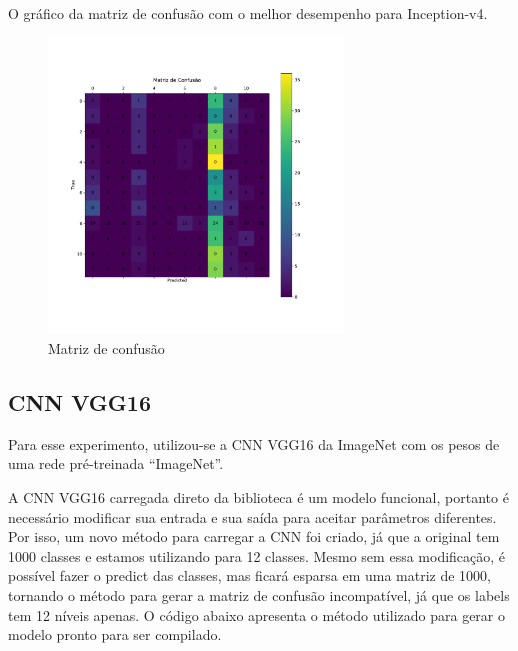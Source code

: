 \documentclass[12pt,
	english,			%
	french,				%
	spanish,			%
	brazil,				%
	]{article}
\begin{document}
O gráfico da matriz de confusão com o melhor desempenho para Inception-v4.

\begin{figure}[!htb]
\centering
\includegraphics[width=0.7\textwidth]{images/cm_inception_v4.pdf}
\caption{\label{fig:grafico01}Matriz de confusão}
\end{figure}

\subsection{CNN VGG16}

Para esse experimento, utilizou-se a CNN VGG16 da ImageNet com os pesos de uma rede pré-treinada ``ImageNet''.

A CNN VGG16 carregada direto da biblioteca é um modelo funcional, portanto é necessário modificar sua entrada e sua saída para aceitar parâmetros diferentes. Por isso, um novo método para carregar a CNN foi criado, já que a original tem 1000 classes e estamos utilizando para 12 classes. Mesmo sem essa modificação, é possível fazer o predict das classes, mas ficará esparsa em uma matriz de 1000, tornando o método para gerar a matriz de confusão incompatível, já que os labels tem 12 níveis apenas. O código abaixo apresenta o método utilizado para gerar o modelo pronto para ser compilado.
\end{document}
